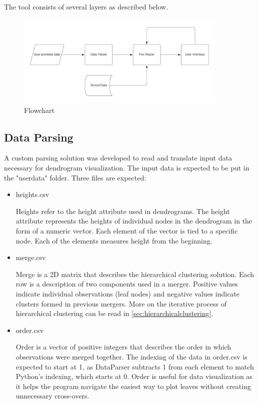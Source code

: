 The tool consists of several layers as described below.
\begin{figure}[h!]
    \centering
    \includegraphics[width=0.9\textwidth]{Figures/Flowchartex1.png}
    \caption{Flowchart}
    \label{fig:flowchart}
\end{figure}

\subsection{Data Parsing}
\label{sec:data-parsing}
A custom parsing solution was developed to read and translate input data necessary for dendrogram visualization. The input data is expected to be put in the "user\textunderscore data" folder. Three files are expected:
\begin{itemize}
    \item heights.csv
    
    Heights refer to the height attribute used in dendrograms. The height attribute represents the heights of individual nodes in the dendrogram in the form of a numeric vector. Each element of the vector is tied to a specific node. Each of the elements measures height from the beginning. 
    
    \item merge.csv

    Merge is a 2D matrix that describes the hierarchical clustering solution. Each row is a description of two components used in a merger. Positive values indicate individual observations (leaf nodes) and negative values indicate clusters formed in previous mergers. More on the iterative process of hierarchical clustering can be read in \ref{sec:hierarchicalclustering}.
    
    \item order.csv

    Order is a vector of positive integers that describes the order in which observations were merged together. The indexing of the data in order.csv is expected to start at 1, as DataParser subtracts 1 from each element to match Python's indexing, which starts at 0. Order is useful for data visualization as it helps the program navigate the easiest way to plot leaves without creating unnecessary cross-overs. 
\end{itemize}

